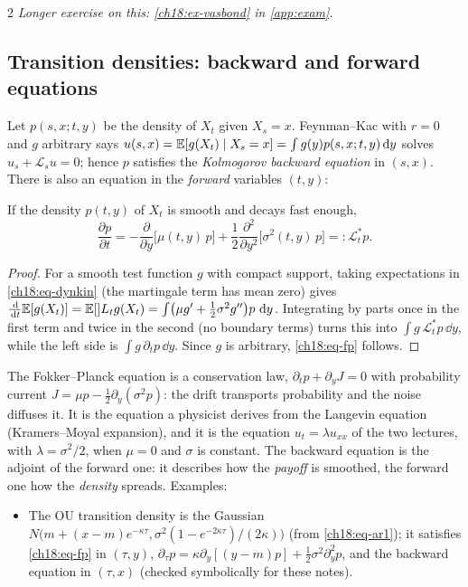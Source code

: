 \begin{paracol}{2}
\noindent\emph{Longer exercise on this: \cref{ch18:ex-vasbond} in \cref{app:exam}.}

\subsection{Transition densities: backward and forward equations}
Let $p(s,x;t,y)$ be the density of $X_t$ given $X_s=x$. Feynman--Kac with $r=0$ and $g$ arbitrary says $u(s,x)=\mathbb{E}[g(X_t)\mid X_s=x]=\int g(y)p(s,x;t,y)\,\mathrm{d} y$ solves $u_s+\mathcal L_su=0$; hence $p$ satisfies the \emph{Kolmogorov backward equation} in $(s,x)$. There is also an equation in the \emph{forward} variables $(t,y)$:

\begin{proposition}\label{ch18:prop-fp}
If the density $p(t,y)$ of $X_t$ is smooth and decays fast enough,
\begin{equation}\label{ch18:eq-fp}
  \frac{\partial p}{\partial t}=-\frac{\partial}{\partial y}\bigl[\mu(t,y)\,p\bigr]+\frac12\frac{\partial^2}{\partial y^2}\bigl[\sigma^2(t,y)\,p\bigr]=:\mathcal L_t^*p .
\end{equation}
\end{proposition}
\begin{proof}
For a smooth test function $g$ with compact support, taking expectations in \eqref{ch18:eq-dynkin} (the martingale term has mean zero) gives $\frac{\,\mathrm{d}}{\,\mathrm{d} t}\mathbb{E}[g(X_t)]=\mathbb{E}[\mathcal] L_tg(X_t)=\int\bigl(\mu g'+\tfrac12\sigma^2g''\bigr)p\,\,\mathrm{d} y$. Integrating by parts once in the first term and twice in the second (no boundary terms) turns this into $\int g\,\mathcal L_t^*p\,\dd y$, while the left side is $\int g\,\partial_tp\,\dd y$. Since $g$ is arbitrary, \eqref{ch18:eq-fp} follows.
\end{proof}
The Fokker--Planck equation is a conservation law, $\partial_tp+\partial_yJ=0$ with probability current $J=\mu p-\tfrac12\partial_y(\sigma^2p)$: the drift transports probability and the noise diffuses it. It is the equation a physicist derives from the Langevin equation (Kramers--Moyal expansion), and it is the equation $u_t=\lambda u_{xx}$ of the two lectures, with $\lambda=\sigma^2/2$, when $\mu=0$ and $\sigma$ is constant. The backward equation is the adjoint of the forward one: it describes how the \emph{payoff} is smoothed, the forward one how the \emph{density} spreads. Examples:
\begin{itemize}
  \item The OU transition density is the Gaussian $N\bigl(m+(x-m)e^{-\kappa\tau},\sigma^2(1-e^{-2\kappa\tau})/(2\kappa)\bigr)$ (from \eqref{ch18:eq-ar1}); it satisfies \eqref{ch18:eq-fp} in $(\tau,y)$, $\partial_\tau p=\kappa\partial_y[(y-m)p]+\tfrac12\sigma^2\partial_y^2p$, and the backward equation in $(\tau,x)$ (checked symbolically for these notes).

\end{itemize}
\end{paracol}
